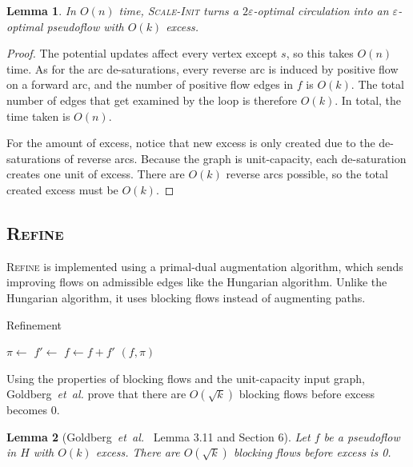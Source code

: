 \documentclass[11pt]{article}
\def\etal{\textsl{et~al.}}
\def\eps{\varepsilon}
\theoremstyle{plain}
\newtheorem{lemma}{Lemma}
\begin{document}
\begin{lemma}
\label{lemma:scale_init}
	In $O(n)$ time, \textsc{Scale-Init} turns a $2\eps$-optimal circulation
	into an $\eps$-optimal pseudoflow with $O(k)$ excess.
\end{lemma}
\begin{proof}
	The potential updates affect every vertex except $s$,
	so this takes $O(n)$ time.
	As for the arc de-saturations, every reverse arc is induced by positive
	flow on a forward arc, and the number of positive flow edges in $f$ is
	$O(k)$.
	The total number of edges that get examined by the loop is therefore
	$O(k)$.
	In total, the time taken is $O(n)$.

	For the amount of excess, notice that new excess is only created due
	to the de-saturations of reverse arcs.
	Because the graph is unit-capacity, each de-saturation creates one unit
	of excess.
	There are $O(k)$ reverse arcs possible, so the total created excess
	must be $O(k)$.
\end{proof}

\subsection{\textsc{Refine}}

\textsc{Refine} is implemented using a primal-dual augmentation algorithm,
which sends improving flows on admissible edges like the Hungarian algorithm.
Unlike the Hungarian algorithm, it uses blocking flows instead of augmenting
paths.

\begin{algorithm}
\caption{Refinement}
\begin{algorithmic}[1]
		\State $\pi \gets$ 
		\State $f' \gets$ 
		\State $f \gets f + f'$
	\EndWhile
	\State\Return $(f, \pi)$
\EndFunction
\end{algorithmic}
\end{algorithm}

Using the properties of blocking flows and the unit-capacity input graph,
Goldberg~{\etal} prove that there are $O(\sqrt{k})$ blocking flows before
excess becomes 0.

\begin{lemma}[Goldberg~{\etal}~\cite{GHKT17} Lemma 3.11 and Section 6]
	Let $f$ be a pseudoflow in $H$ with $O(k)$ excess.
	There are $O(\sqrt{k})$ blocking flows before excess is 0.
\end{lemma}
\end{document}
